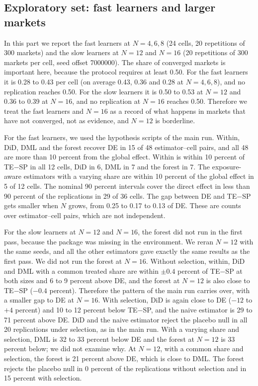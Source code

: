 \documentclass[11pt]{article}
\begin{document}
\subsection{Exploratory set: fast learners and larger markets}\label{sec:explore}
In this part we report the fast learners at $N=4,6,8$ (24 cells, 20 repetitions of 300 markets) and the slow learners at $N=12$ and $N=16$ (20 repetitions of 300 markets per cell, seed offset 7000000). The share of converged markets is important here, because the protocol requires at least 0.50. For the fast learners it is 0.28 to 0.43 per cell (on average 0.43, 0.36 and 0.28 at $N=4,6,8$), and no replication reaches 0.50. For the slow learners it is 0.50 to 0.53 at $N=12$ and 0.36 to 0.39 at $N=16$, and no replication at $N=16$ reaches 0.50. Therefore we treat the fast learners and $N=16$ as a record of what happens in markets that have not converged, not as evidence, and $N=12$ is borderline.

For the fast learners, we used the hypothesis scripts of the main run. Within, DiD, DML and the forest recover DE in 15 of 48 estimator--cell pairs, and all 48 are more than 10 percent from the global effect. Within is within 10 percent of TE$-$SP in all 12 cells, DiD in 6, DML in 7 and the forest in 7. The exposure-aware estimators with a varying share are within 10 percent of the global effect in 5 of 12 cells. The nominal 90 percent intervals cover the direct effect in less than 90 percent of the replications in 29 of 36 cells. The gap between DE and TE$-$SP gets smaller when $N$ grows, from 0.25 to 0.17 to 0.13 of DE. These are counts over estimator--cell pairs, which are not independent.

For the slow learners at $N=12$ and $N=16$, the forest did not run in the first pass, because the package was missing in the environment. We reran $N=12$ with the same seeds, and all the other estimators gave exactly the same results as the first pass. We did not run the forest at $N=16$. Without selection, within, DiD and DML with a common treated share are within $\pm0.4$ percent of TE$-$SP at both sizes and 6 to 9 percent above DE, and the forest at $N=12$ is also close to TE$-$SP ($-0.4$ percent). Therefore the pattern of the main run carries over, with a smaller gap to DE at $N=16$. With selection, DiD is again close to DE ($-12$ to $+4$ percent) and 10 to 12 percent below TE$-$SP, and the naive estimator is 29 to 71 percent above DE. DiD and the naive estimator reject the placebo null in all 20 replications under selection, as in the main run. With a varying share and selection, DML is 32 to 33 percent below DE and the forest at $N=12$ is 33 percent below; we did not examine why. At $N=12$, with a common share and selection, the forest is 21 percent above DE, which is close to DML. The forest rejects the placebo null in 0 percent of the replications without selection and in 15 percent with selection.
\end{document}
